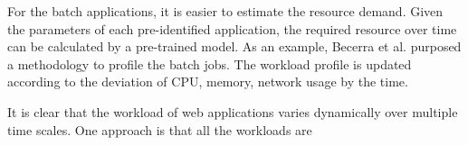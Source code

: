 \documentclass[sigchi]{acmart}
\begin{document}
For the batch applications, it is easier to estimate the resource demand. Given the parameters of each pre-identified application, the required resource over time can be calculated by a pre-trained model.
As an example, Becerra et al. purposed a methodology to profile the batch jobs. \cite{becerra2009batch} 
The workload profile is updated according  to the deviation  of CPU, memory, network usage by the time. 

It is clear that the workload of web applications varies dynamically over multiple time scales. One approach is that all the workloads are 

\newpage  


\end{document}
